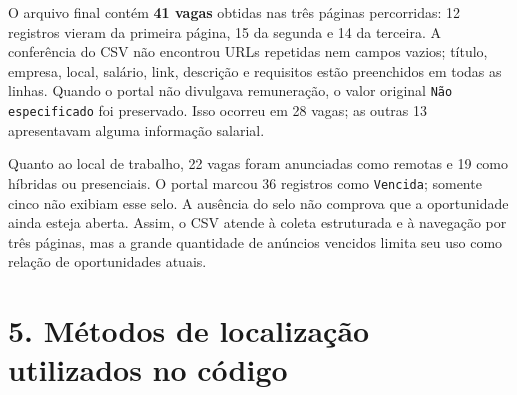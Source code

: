 \documentclass[10pt,a4paper]{article}
\begin{document}
O arquivo final contém \textbf{41 vagas} obtidas nas três páginas percorridas: 12 registros vieram da primeira página, 15 da segunda e 14 da terceira. A conferência do CSV não encontrou URLs repetidas nem campos vazios; título, empresa, local, salário, link, descrição e requisitos estão preenchidos em todas as linhas. Quando o portal não divulgava remuneração, o valor original \texttt{Não especificado} foi preservado. Isso ocorreu em 28 vagas; as outras 13 apresentavam alguma informação salarial.

Quanto ao local de trabalho, 22 vagas foram anunciadas como remotas e 19 como híbridas ou presenciais. O portal marcou 36 registros como \texttt{Vencida}; somente cinco não exibiam esse selo. A ausência do selo não comprova que a oportunidade ainda esteja aberta. Assim, o CSV atende à coleta estruturada e à navegação por três páginas, mas a grande quantidade de anúncios vencidos limita seu uso como relação de oportunidades atuais.

\clearpage

\section*{5. Métodos de localização utilizados no código}
\end{document}
